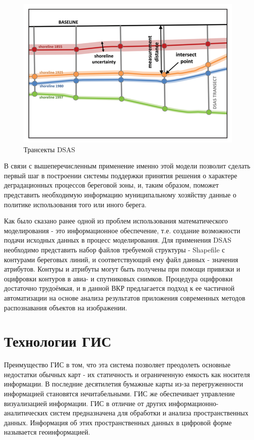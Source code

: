 \documentclass[732,fontsize=14pt,final]{studrep}
\begin{document}
\begin{figure}[htp]
  \centering
  \includegraphics[width=\linewidth]{pics/image9.png}
  \caption{Трансекты DSAS}\label{dsas-trans}
\end{figure}

В связи с вышеперечисленным применение именно этой модели позволит сделать первый шаг в построении системы поддержки принятия решения о характере деградационных процессов береговой зоны, и, таким образом, поможет представить необходимую информацию муниципальному хозяйству данные о политике использования того или иного берега.

Как было сказано ранее одной из проблем использования математического моделирования - это информационное обеспечение, т.е. создание возможности подачи исходных данных в процесс моделирования. Для применения DSAS необходимо представить набор файлов требуемой структуры - Shapefile с контурами береговых линий, и соответствующий ему файл данных - значения атрибутов. Контуры и атрибуты могут быть получены при помощи привязки и оцифровки контуров в авиа- и спутниковых снимков. Процедура оцифровки достаточно трудоёмкая, и в данной ВКР предлагается подход к ее частичной автоматизации на основе анализа результатов приложения современных методов распознавания объектов на изображении.

\section{Технологии ГИС}

Преимущество ГИС в том, что эта система позволяет преодолеть основные недостатки обычных карт - их статичность и ограниченную емкость как носителя информации. В последние десятилетия бумажные карты из-за перегруженности информацией становятся нечитабельными. ГИС же обеспечивает управление визуализацией информации. ГИС в отличие от других информационно-аналитических систем предназначена для обработки и анализа пространственных данных. Информация об этих пространственных данных в цифровой форме называется геоинформацией.
\end{document}
